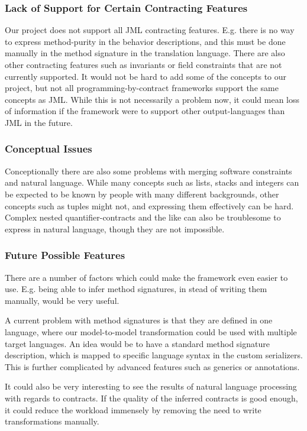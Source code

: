 \subsubsection{Lack of Support for Certain Contracting Features}
Our project does not support all JML contracting features.
E.g. there is no way to express method-purity in the behavior descriptions, and this must be done manually in the method signature in the translation language.
There are also other contracting features such as invariants or field constraints that are not currently supported.
It would not be hard to add some of the concepts to our project, but not all programming-by-contract frameworks support the same concepts as JML.
While this is not necessarily a problem now, it could mean loss of information if the framework were to support other output-languages than JML in the future.

\subsubsection{Conceptual Issues} 
Conceptionally there are also some problems with merging software constraints and natural language.
While many concepts such as lists, stacks and integers can be expected to be known by people with many different backgrounds, other concepts such as tuples might not, and expressing them effectively can be hard.
Complex nested quantifier-contracts and the like can also be troublesome to express in natural language, though they are not impossible.

\subsubsection{Future Possible Features}
There are a number of factors which could make the framework even easier to use.
E.g. being able to infer method signatures, in stead of writing them manually, would be very useful.

A current problem with method signatures is that they are defined in one language, where our model-to-model transformation could be used
with multiple target languages.
An idea would be to have a standard method signature description, which is mapped to specific language syntax in the custom serializers.
This is further complicated by advanced features such as generics or annotations.

It could also be very interesting to see the results of natural language processing with regards to contracts.
If the quality of the inferred contracts is good enough, it could reduce the workload immensely by removing the need to write transformations manually.
